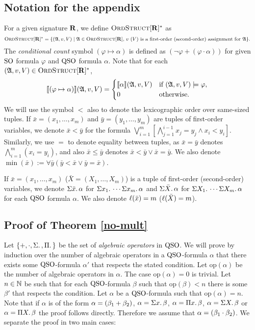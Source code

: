 

\subsection{Notation for the appendix}

For a given signature $\mathbf{R}$, we define $\text{\sc OrdStruct}[\mathbf{R}]^*$ as $$\text{\sc OrdStruct}[\mathbf{R}]^* = \{(\mathfrak{A},v,V) \mid \mathfrak{A}\in\text{\sc OrdStruct}[\mathbf{R}]\text{, $v$ ($V$) is a first-order (second-order) assignment for $\mathfrak{A}$}  \}.$$
The {\em conditional count} symbol $(\varphi \mapsto \alpha)$ is defined as $(\neg\varphi + (\varphi\cdot\alpha))$ for given ${\rm SO}$ formula $\varphi$ and ${\rm QSO}$ formula $\alpha$. Note that for each $(\mathfrak{A},v,V) \in \text{\sc OrdStruct}[\mathbf{R}]^*$, 
$$
{\llbracket{}{(\varphi \mapsto \alpha)}\rrbracket}(\mathfrak{A},v,V) = 
\begin{cases}
{\llbracket{}{\alpha}\rrbracket}(\mathfrak{A},v,V) &\text{if } (\mathfrak{A},v,V)\models\varphi,\\
0 &\text{otherwise}.
\end{cases}
$$
We will use the symbol $<$ also to denote the lexicographic order over same-sized tuples. If $\bar{x} = (x_1,\ldots,x_m)$ and $\bar{y} = (y_1,\ldots,y_m)$ are tuples of first-order variables, we denote $\bar{x} < \bar{y}$ for the formula $\bigvee_{i = 1}^m[\bigwedge_{j = 1}^{i-1}x_j = y_j \wedge x_i < y_i]$. Similarly, we use $=$ to denote equality between tuples, as $\bar{x} = \bar{y}$ denotes $\bigwedge_{i = 1}^m(x_i = y_i)$, and also $\bar{x}\leq\bar{y}$ denotes $\bar{x} < \bar{y} \vee \bar{x} = \bar{y}$. We also denote $\min(\bar{x}) := \forall\bar{y}(\bar{y} < \bar{x}\vee \bar{y} = \bar{x})$.

If $\bar{x} = (x_1,\ldots,x_m)$ ($\bar{X} = (X_1,\ldots,X_m)$) is a tuple of first-order (second-order) variables, we denote $\Sigma{\bar{x}}.\,\alpha$ for $\Sigma{x_1}.\,\cdots\Sigma{x_m}.\,\alpha$ and $\Sigma{\bar{X}}.\,\alpha$ for $\Sigma{X_1}.\,\cdots\Sigma{X_m}.\,\alpha$ for each ${\rm QSO}$ formula $\alpha$. We also denote $\ell(\bar{x}) = m$ ($\ell(\bar{X}) = m$).
\subsection{Proof of Theorem \ref{no-mult}}



Let $\{+, \cdot, \Sigma{}.\,, \Pi{}.\,\}$ be the set of {\it algebraic operators} in ${\rm QSO}$. We will prove by induction over the number of algebraic operators in a ${\rm QSO}$-formula $\alpha$ that there exists some ${\rm QSO}$-formula $\alpha'$ that respects the stated condition. Let $\text{op}(\alpha)$ be the number of algebraic operators in $\alpha$. The case $\text{op}(\alpha) = 0$ is trivial. Let $n\in\mathbb{N}$ be such that for each ${\rm QSO}$-formula $\beta$ such that $\text{op}(\beta) < n$ there is some $\beta'$ that respects the condition. Let $\alpha$ be a ${\rm QSO}$-formula such that $\text{op}(\alpha) = n$. Note that if $\alpha$ is of the form $\alpha = (\beta_1 + \beta_2)$, $\alpha = \Sigma{x}.\, \beta$, $\alpha = \Pi{x}.\, \beta$, $\alpha = \Sigma{X}.\, \beta$ or $\alpha = \Pi{X}.\, \beta$ the proof follows directly. Therefore we assume that $\alpha = (\beta_1 \cdot \beta_2)$. We separate the proof in two main cases:

